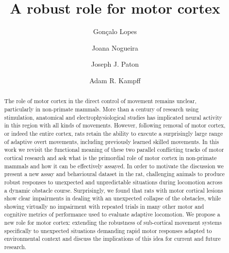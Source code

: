 \documentclass[12pt]{article}
\title{A robust role for motor cortex}
\author{Gonçalo Lopes}
\author{Joana Nogueira}
\author{Joseph J. Paton}
\author{Adam R. Kampff}
\affil{Champalimaud Neuroscience Programme\\ Champalimaud Centre for the Unknown, Lisbon, Portugal}
\newcounter{video}
\begin{document}
\maketitle

\begin{linenumbers}
\begin{abstract}
The role of motor cortex in the direct control of movement remains unclear, particularly in non-primate mammals. More than a century of research using stimulation, anatomical and electrophysiological studies has implicated neural activity in this region with all kinds of movements. However, following removal of motor cortex, or indeed the entire cortex, rats retain the ability to execute a surprisingly large range of adaptive overt movements, including previously learned skilled movements. In this work we revisit the functional meaning of these two parallel conflicting tracks of motor cortical research and ask what is the primordial role of motor cortex in non-primate mammals and how it can be effectively assayed. In order to motivate the discussion we present a new assay and behavioural dataset in the rat, challenging animals to produce robust responses to unexpected and unpredictable situations during locomotion across a dynamic obstacle course. Surprisingly, we found that rats with motor cortical lesions show clear impairments in dealing with an unexpected collapse of the obstacles, while showing virtually no impairment with repeated trials in many other motor and cognitive metrics of performance used to evaluate adaptive locomotion. We propose a new role for motor cortex: extending the robustness of sub-cortical movement systems specifically to unexpected situations demanding rapid motor responses adapted to environmental context and discuss the implications of this idea for current and future research.
\end{abstract}








\end{linenumbers}

\setcounter{biburlnumpenalty}{100}
\setcounter{biburlucpenalty}{100}
\setcounter{biburllcpenalty}{100}
\printbibliography
\end{document}
